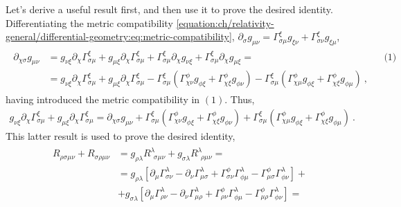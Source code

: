 \documentclass[letterpaper,10pt,english]{jupyterBook}
\begin{document}
\sphinxAtStartPar
Let’s derive a useful result first, and then use it to prove the desired identity. Differentiating the metric compatibility \eqref{equation:ch/relativity-general/differential-geometry:eq:metric-compatibility}, \(\partial_{\sigma} g_{\mu \nu} = \Gamma^{\xi}_{\sigma \mu} g_{\xi \nu} + \Gamma^{\xi}_{\sigma \nu} g_{\xi \mu}\),
\begin{equation*}
\begin{split}\begin{aligned}
  \partial_{\chi \sigma} g_{\mu \nu}
  & = g_{\nu \xi} \partial_{\chi} \Gamma^{\xi}_{\sigma \mu} + g_{\mu \xi} \partial_{\chi} \Gamma^{\xi}_{\sigma \mu}
    + \Gamma^{\xi}_{\sigma \mu} \partial_{\chi} g_{\nu \xi} + \Gamma^{\xi}_{\sigma \mu} \partial_{\chi} g_{\mu \xi} = && \text{(1)} \\
  & = g_{\nu \xi} \partial_{\chi} \Gamma^{\xi}_{\sigma \mu} + g_{\mu \xi} \partial_{\chi} \Gamma^{\xi}_{\sigma \mu}
    - \Gamma^{\xi}_{\sigma \mu} \left( \Gamma_{\chi \nu}^{\phi} g_{\phi \xi} + \Gamma_{\chi \xi}^{\phi} g_{\phi \nu} \right)
    - \Gamma^{\xi}_{\sigma \mu} \left( \Gamma_{\chi \mu}^{\phi} g_{\phi \xi} + \Gamma_{\chi \xi}^{\phi} g_{\phi \mu} \right) \ ,
\end{aligned}\end{split}
\end{equation*}
\sphinxAtStartPar
having introduced the metric compatibility in \((1)\). Thus,
\begin{equation}\label{equation:ch/relativity-general/differential-geometry:eq:riemann:prop2:dim:1}
\begin{split}
g_{\nu \xi} \partial_{\chi} \Gamma^{\xi}_{\sigma \mu} + g_{\mu \xi} \partial_{\chi} \Gamma^{\xi}_{\sigma \mu}
= \partial_{\chi \sigma} g_{\mu \nu}
+ \Gamma^{\xi}_{\sigma \mu} \left( \Gamma_{\chi \nu}^{\phi} g_{\phi \xi} + \Gamma_{\chi \xi}^{\phi} g_{\phi \nu} \right)
+ \Gamma^{\xi}_{\sigma \mu} \left( \Gamma_{\chi \mu}^{\phi} g_{\phi \xi} + \Gamma_{\chi \xi}^{\phi} g_{\phi \mu} \right) \ .
\end{split}
\end{equation}
\sphinxAtStartPar
This latter result is used to prove the desired identity,
\begin{equation*}
\begin{split}\begin{aligned}
R_{\rho \sigma \mu \nu} + R_{\sigma \rho \mu \nu} 
& = g_{\rho \lambda} R^{\lambda}_{\ \ \sigma \mu \nu} + g_{\sigma \lambda} R^{\lambda}_{\ \ \rho \mu \nu} = \\
& = g_{\rho   \lambda} \left[ \partial_{\mu} \Gamma_{\sigma \nu}^{\lambda} - \partial_{\nu} \Gamma_{\mu \sigma}^{\lambda} + \Gamma_{\sigma \nu}^{\phi} \Gamma_{\phi \mu}^{\lambda} - \Gamma_{\mu \sigma}^{\phi} \Gamma_{\phi \nu}^{\lambda} \right] + \\
& + g_{\sigma \lambda} \left[ \partial_{\mu} \Gamma_{\rho   \nu}^{\lambda} - \partial_{\nu} \Gamma_{\mu \rho  }^{\lambda} + \Gamma_{\rho   \nu}^{\phi} \Gamma_{\phi \mu}^{\lambda} - \Gamma_{\mu \rho  }^{\phi} \Gamma_{\phi \nu}^{\lambda}  \right] = \\
\end{aligned}\end{split}
\end{equation*}
\end{document}
